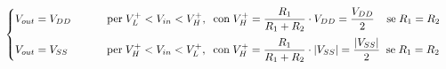 \documentclass{report}
\begin{document}
\begin{equation}
   \begin{cases} %
   V_{out}= V_{DD}\;\indent\indent \mathrm{per\;}  V_L^+<V_{in}<V_H^+\mathrm{, \;\; con\;}\displaystyle{ V_H^+=\frac{R_1}{R_1+R_2}\cdot V_{DD}=\frac{V_{DD}}{2}}\mathrm{\;\;\;\; se \;} R_1=R_2\\[10pt]
   V_{out}= V_{SS}\;\;\indent\indent \mathrm{per\;} V_H^+<V_{in}<V_L^+\mathrm{, \;\; con\;}\displaystyle{ V_H^+=\frac{R_1}{R_1+R_2}\cdot |V_{SS}|=\frac{|V_{SS}|}{2}}\mathrm{\;\; se \;} R_1=R_2\\
   \end{cases}
\end{equation}
\end{document}
